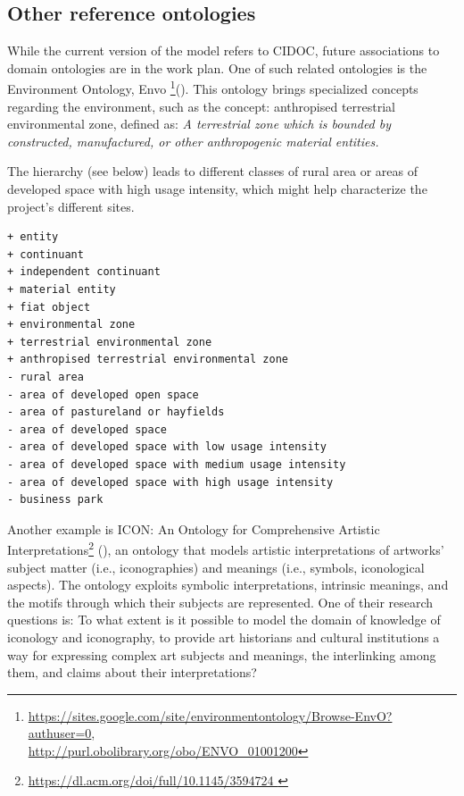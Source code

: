 \documentclass[10pt]{report}
\begin{document}
\subsection{Other reference ontologies}

While the current version of the model refers to CIDOC, future associations to domain ontologies are in the work plan. One of such related ontologies is the  Environment Ontology, 
Envo \footnote{\url{https://sites.google.com/site/environmentontology/Browse-EnvO?authuser=0}, \\ \url{http://purl.obolibrary.org/obo/ENVO_01001200}
}{(\cite{buttigieg2013environment})}. This ontology brings specialized concepts regarding the environment, such as the 
concept: anthropised terrestrial environmental zone, 
defined as: 
\textit{A terrestrial zone which is bounded by constructed, manufactured, or other anthropogenic material entities.}

The hierarchy (see below) leads to different classes of rural area or areas of developed space with high usage intensity, which might help characterize the project's different sites.

\begin{verbatim}
+ entity
+ continuant
+ independent continuant
+ material entity
+ fiat object
+ environmental zone
+ terrestrial environmental zone
+ anthropised terrestrial environmental zone
- rural area
- area of developed open space
- area of pastureland or hayfields
- area of developed space
- area of developed space with low usage intensity
- area of developed space with medium usage intensity
- area of developed space with high usage intensity
- business park    
\end{verbatim}



Another example is 
ICON: An Ontology for Comprehensive Artistic Interpretations\footnote{\url{https://dl.acm.org/doi/full/10.1145/3594724
}} (\cite{sartini2023icon}),  an ontology that models artistic interpretations of artworks’ subject matter (i.e., iconographies) and meanings (i.e., symbols, iconological aspects). 
The ontology exploits symbolic interpretations, intrinsic meanings, and the motifs through which their subjects are represented. One of their research questions is: 	
To what extent is it possible to model the domain of knowledge of iconology and iconography, to provide art historians and cultural institutions a way for expressing complex art subjects and meanings, the interlinking among them, and claims about their interpretations?
\end{document}
